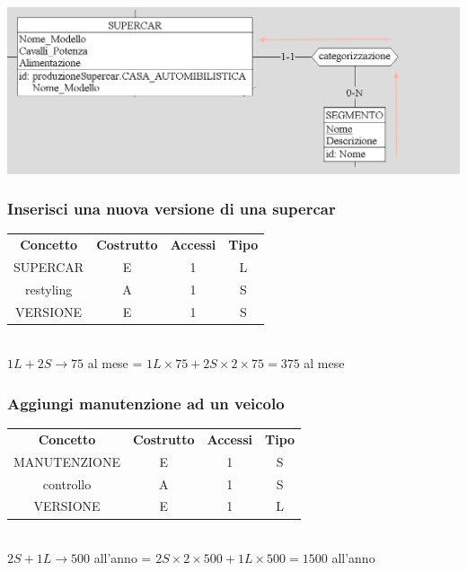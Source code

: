 \documentclass[11pt]{article}
\begin{document}
\begin{center}
    \includegraphics[scale=0.75]{images/navigationSchemes/supercarSegmento.png}
\end{center}

\subsubsection{Inserisci una nuova versione di una supercar} 

\begin{table}[H]
    \centering
    \begin{tabular}{c c c c}
        \rowcolor{red!20!}
        \textbf{Concetto} & \textbf{Costrutto} & \textbf{Accessi} &
        \textbf{Tipo}\\
        SUPERCAR & E & 1 & L \\
        restyling & A & 1 & S \\
        VERSIONE & E & 1 & S \\
    \end{tabular}\\
    \( 1L + 2S \rightarrow 75 \) al mese = \( 1L \times 75 + 2S \times 2 \times
    75 = 375 \) al mese
\end{table}

\subsubsection{Aggiungi manutenzione ad un veicolo} 

\begin{table}[H]
    \centering
    \begin{tabular}{c c c c}
        \rowcolor{red!20!}
        \textbf{Concetto} & \textbf{Costrutto} & \textbf{Accessi} &
        \textbf{Tipo}\\
        MANUTENZIONE & E & 1 & S \\
        controllo & A & 1 & S \\
        VERSIONE & E & 1 & L \\
    \end{tabular}\\
    \( 2S  + 1L \rightarrow  500\) all'anno = \( 2S \times 2 \times 500 + 1L
    \times 500 = 1500 \) all'anno
\end{table}
\end{document}
